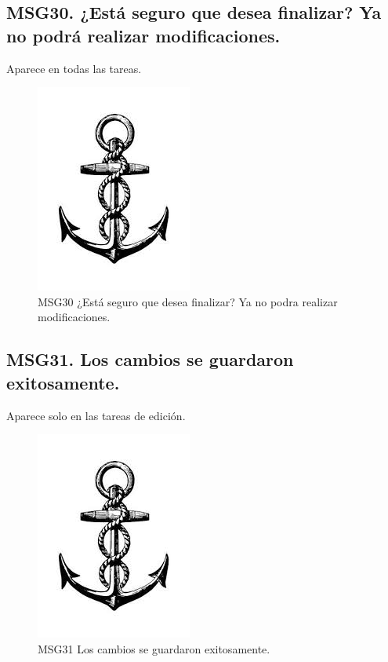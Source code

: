     \subsection{MSG30. ¿Está seguro que desea finalizar? Ya no podrá realizar modificaciones.}
    Aparece en todas las tareas.
        \begin{figure}[htbp]
            \begin{center}
                \includegraphics[width=.4\textwidth]{images/MSG/ancla}
                \caption{MSG30 ¿Está seguro que desea finalizar? Ya no podra realizar modificaciones.}
                \label{fig:MSG30}
            \end{center}
        \end{figure}

    \subsection{MSG31. Los cambios se guardaron exitosamente.}
    Aparece solo en las tareas de edición.
        \begin{figure}[htbp]
            \begin{center}
                \includegraphics[width=.4\textwidth]{images/MSG/ancla}
                \caption{MSG31 Los cambios se guardaron exitosamente.}
                \label{fig:MSG31}
            \end{center}
        \end{figure}

